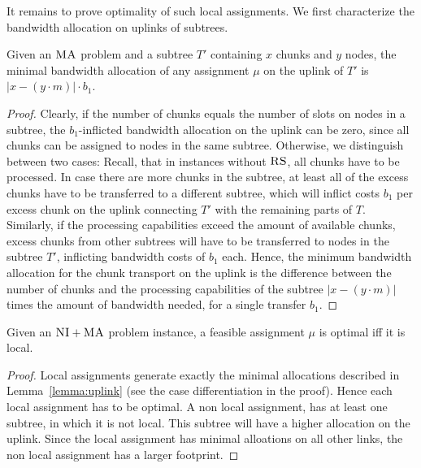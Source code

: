 \documentclass[9pt]{sigcomm-alternate}
\newcommand{\MaFactor}{m}
\newcommand{\VmChunkAssignment}{\mu}
\newcommand{\CC}{\textsc{NI}}
\newcommand{\RS}{\textsc{RS}}
\newcommand{\MA}{\textsc{MA}}
\newcommand{\Tree}{\ensuremath{T}}
\newcommand{\CostTrans}{\ensuremath{b_1}}
\begin{document}
It remains to prove optimality of such local assignments.
We first characterize the bandwidth allocation on uplinks of subtrees.
\begin{lemma}\label{lem:uplink-alloc}
Given an $\MA$ problem and a subtree $\Tree'$
containing $x$
chunks and $y$ nodes, the minimal bandwidth allocation of any
assignment
$\VmChunkAssignment$ on the uplink of $\Tree'$ is $|x-(y\cdot\MaFactor)|\cdot
\CostTrans$.\label{lemma:uplink}
\end{lemma}
\begin{proof}
Clearly, if the number of chunks equals the number of slots on nodes in a
subtree,
the $\CostTrans$-inflicted bandwidth allocation on the uplink can be
zero, since all chunks can be assigned to nodes in the same subtree.
Otherwise, we distinguish between two cases: Recall, that in instances
without $\RS$, all chunks have to be processed. In case
there are more chunks in the subtree, at least all of the excess chunks have to
be transferred to a different subtree, which will
inflict costs $\CostTrans$ per excess chunk on the uplink connecting $\Tree'$
with the
remaining parts of $\Tree$. Similarly, if the processing capabilities exceed the
amount of
available chunks, excess chunks from other subtrees will have to be transferred
to
nodes in the subtree $\Tree'$, inflicting bandwidth costs of $\CostTrans$ each.
Hence, the minimum bandwidth allocation for the chunk transport on the uplink
is the difference between the number of chunks and the processing capabilities
of the subtree $|x-(y\cdot\MaFactor)|$ times the amount of bandwidth needed,
for a single transfer $\CostTrans$.
\end{proof}


\begin{theorem}
Given an $\CC+\MA$ problem instance, a feasible assignment $\VmChunkAssignment$
is optimal iff it is local.
\label{thm:local_optimal}
\end{theorem}

\begin{proof}
Local assignments generate exactly the minimal allocations described in
Lemma~\ref{lemma:uplink} (see the case differentiation in the proof). Hence
each local assignment has to be optimal. A non local assignment, has at least
one subtree, in which it is not local. This subtree will have a higher
allocation on the uplink. Since the local assignment has minimal alloations
on all other links, the non local assignment has a larger footprint.
\end{proof}
\end{document}
